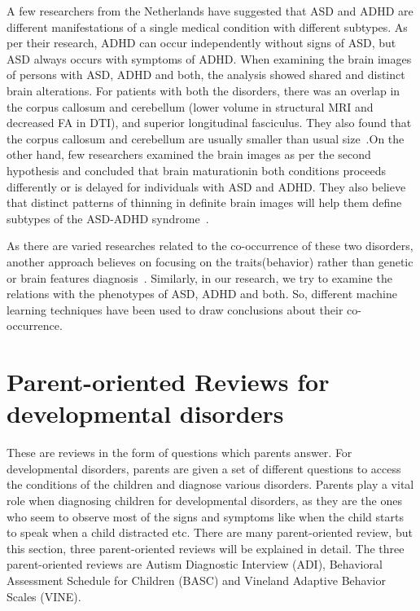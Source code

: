 A few researchers from the Netherlands have suggested that ASD and ADHD are different manifestations of a single medical condition with different subtypes. As per their research, ADHD can occur independently without signs of ASD, but ASD always occurs with symptoms of ADHD\cite{van2012autism}. When examining the brain images of persons with ASD, ADHD and both, the analysis showed shared and distinct brain alterations. For patients with both the disorders, there was an overlap in the corpus callosum and cerebellum (lower volume in structural MRI and decreased FA in DTI), and superior longitudinal fasciculus. They also found that the corpus callosum and cerebellum are usually smaller than usual size~\cite{dougherty2016comparison}.On the other hand, few researchers examined the brain images as per the second hypothesis and concluded that brain maturationin both conditions proceeds differently or is delayed for individuals with ASD and ADHD. They also believe that distinct patterns of thinning in definite brain images will help them define subtypes of the ASD-ADHD syndrome~\cite{rommelse2017structural}.

As there are varied researches related to the co-occurrence of these two disorders, another approach believes on focusing on the traits(behavior) rather than genetic or brain features diagnosis~\cite{Kottepeds.2012-3947}. Similarly, in our research, we try to examine the relations with the phenotypes of ASD, ADHD and both. So, different machine learning techniques have been used to draw conclusions about their co-occurrence.

\section{Parent-oriented Reviews for developmental disorders}
These are reviews in the form of questions which parents answer. For developmental disorders, parents are given a set of different questions to access the conditions of the children and diagnose various disorders. Parents play a vital role when diagnosing children for developmental disorders, as they are the ones who seem to observe most of the signs and symptoms like when the child starts to speak when a child distracted etc. There are many parent-oriented review, but this section, three parent-oriented reviews will be explained in detail. The three parent-oriented reviews are Autism Diagnostic Interview (ADI), Behavioral Assessment Schedule for Children (BASC) and Vineland Adaptive Behavior Scales (VINE).

